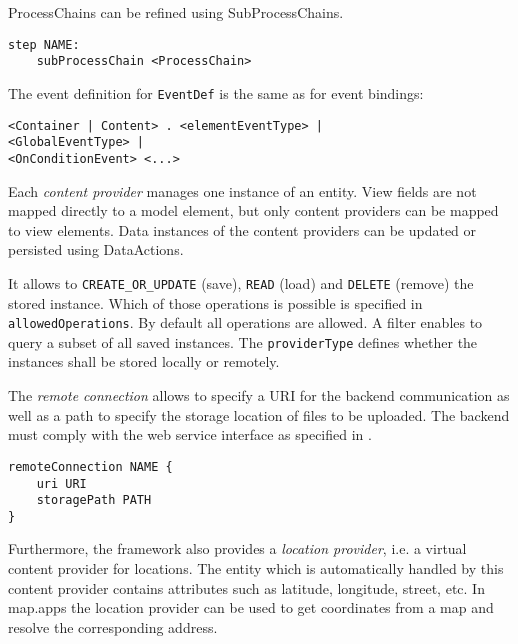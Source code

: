ProcessChains can be refined using SubProcessChains.
\begin{lstlisting}
step NAME:
	subProcessChain <ProcessChain>
\end{lstlisting}

The event definition for \lstinline!EventDef! is the same as for event bindings:
\begin{lstlisting}
<Container | Content> . <elementEventType> |
<GlobalEventType> |
<OnConditionEvent> <...>
\end{lstlisting}

Each \textit{content provider} manages one instance of an entity. View fields are not mapped directly to a model element, but only content providers can be mapped to view elements. Data instances of the content providers can be updated or persisted using DataActions.

It allows to \lstinline!CREATE_OR_UPDATE! (save), \lstinline!READ! (load) and \lstinline!DELETE! (remove) the stored instance. Which of those operations is possible is specified in \lstinline!allowedOperations!. By default all operations are allowed. A filter enables to query a subset of all saved instances. The \lstinline!providerType! defines whether the instances shall be stored locally or remotely.

The \textit{remote connection} allows to specify a URI for the backend communication as well as a path to specify the storage location of files to be uploaded. The backend must comply with the \MD web service interface as specified in .
\begin{lstlisting}
remoteConnection NAME {
	uri URI
	storagePath PATH
}
\end{lstlisting}

Furthermore, the \MD framework also provides a \textit{location provider}, i.e. a virtual content provider for locations. The entity which is automatically handled by this content provider contains attributes such as latitude, longitude, street, etc. In map.apps the location provider can be used to get coordinates from a map and resolve the corresponding address.
